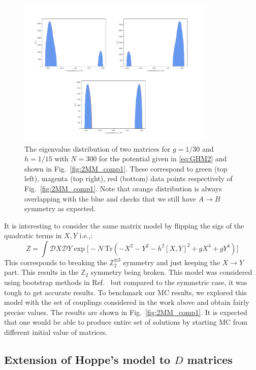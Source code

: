 \documentclass[11pt]{article}
\begin{document}
\begin{figure}[htbp] 
	\centering 
	\includegraphics[width=0.85\textwidth]{figs/all_symb_ev.pdf}
	\caption{\label{fig:2MM_evd}The eigenvalue distribution of two matrices for $g=1/30$ and $h=1/15$ 
	with $N=300$ for the potential given in \ref{eq:GHM2} and shown in Fig.~\ref{fig:2MM_comp1}.
	These correspond to green (top left), magenta (top right), red (bottom) data points respectively of Fig.~\ref{fig:2MM_comp1}.
	Note that orange distribution is always overlapping with the blue and checks that
	we still have $A \to B$ symmetry as expected.}
\end{figure}

It is interesting to consider the same matrix model by flipping the sigs of the quadratic terms in $X,Y$ i.e.,:
\begin{equation}
\label{eq:GHM2} 
Z = \int \mathcal{D}X \mathcal{D}Y \exp \Big[-N ~ \mbox{Tr} (-X^2  -Y^2 - h^2 [X,Y]^2 + gX^4 + gY^4) \Big]	
\end{equation} 
This corresponds to breaking the $\mathbb{Z}_{2}^{\otimes 3}$ symmetry and just keeping the $X \to Y$ part. This results in the $\mathbb{Z}_{2}$ 
symmetry being broken. This model was considered using bootstrap methods in 
Ref.~\cite{Kazakov:2021lel} but compared to the symmetric case, it was tough to get accurate results. 
To benchmark our MC results, we explored this model
with the set of couplings considered in the work above and obtain fairly precise values. 
The results are shown in Fig.~\ref{fig:2MM_comp1}. It is expected that one would be able to
produce entire set of solutions by starting MC from different initial value of matrices. 
\subsection{\label{subsec:ext_Hoppe}Extension of Hoppe's model to $D$ matrices}
\end{document}
